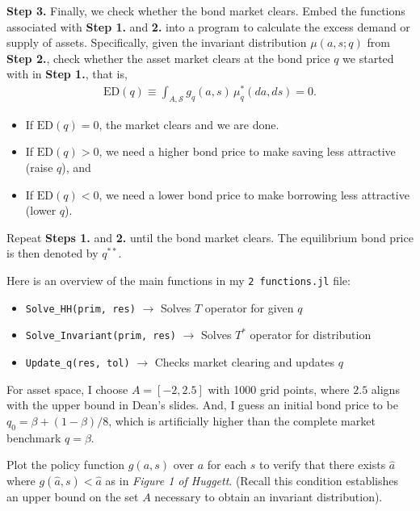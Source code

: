 \par\noindent \colorbox{black!12}{\textbf{Step 3.}} Finally, we check whether the bond market clears.
Embed the functions associated with \textbf{Step 1.} and \textbf{2.} into a program to calculate the
excess demand or supply of assets. Specifically, given the invariant distribution
$\mu(a,s;q)$ from \textbf{Step 2.}, check whether the asset market clears at the bond
price $q$ we started with in \textbf{Step 1.}, that is,
\begin{eqnarray}
    \text{ED}(q) \equiv \int_{A,\mathcal{S}} g_q(a,s)\,\mu^*_q(da,ds) = 0.
\end{eqnarray} \begin{itemize}
    \item If $\text{ED}(q) = 0$, the market clears and we are done.
    \item If $\text{ED}(q) > 0$, we need a higher bond price to make saving less attractive (raise $q$), and
    \item If $\text{ED}(q) < 0$, we need a lower bond price to make borrowing less attractive (lower $q$).
\end{itemize} Repeat \textbf{Steps 1.} and \textbf{2.} until the bond
market clears. The equilibrium bond price is then denoted by $q^{**}$.

\begin{remark} Here is an overview of the main functions in my \colorbox{blue!12}{\texttt{2 functions.jl}} file:
    \begin{itemize}
        \item[\circled{1}] \verb|Solve_HH(prim, res)| $\rightarrow$ Solves $T$ operator for given $q$
        \item[\circled{2}] \verb|Solve_Invariant(prim, res)| $\rightarrow$ Solves $T^*$ operator for distribution
        \item[\circled{3}] \verb|Update_q(res, tol)| $\rightarrow$ Checks market clearing and updates $q$
    \end{itemize} For asset space, I choose $A = [-2, 2.5]$ with 1000 grid points, where $2.5$ aligns with
    the upper bound in Dean's slides. And, I guess an initial bond price to be $q_0 = \beta + (1-\beta)/8$,
    which is artificially higher than the complete market benchmark $q = \beta$.
\end{remark}

\newpage

\begin{framedexercise}
    Plot the policy function $g(a,s)$ over $a$ for each $s$ to verify that there
    exists $\hat{a}$ where $g(\hat{a},s) < \hat{a}$ as in \textit{Figure 1 of Huggett}.
    (Recall this condition establishes an upper bound on the set $A$ necessary to
    obtain an invariant distribution).
\end{framedexercise}


